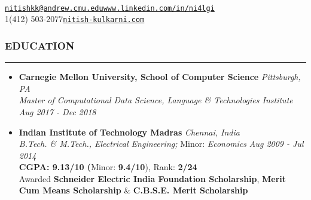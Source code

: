 \documentclass[10pt,a4paper,English]{article}
\newcommand\roottitle[1]{\vspace{-4mm}\subsubsection*{\uppercase{#1}}\vspace{-0.3em}\nopagebreak[4]\hrule\vspace{4mm}}
\newcommand\itemyear[1]{\hfill \emph{\color{itemyear} #1}}
\newcommand\itemenvnoindent{\setlength\itemsep{-1pt} \vspace{-1.5mm}}
\newcommand\hspacing{1mm}
\begin{document}
 \\
\vspace{-5mm}

\small

\noindent \href{mailto:nitishkk@andrew.cmu.edu}{\texttt{nitishkk\mbox{}@\mbox{}andrew.cmu.edu}}\hfill\href{https://www.linkedin.com/in/ni4lgi}{\texttt{www.linkedin.com/in/ni4lgi}}\\
\noindent \textsmaller{+}1(412) 503-2077\hfill\href{http://www.nitish-kulkarni.com}{\texttt{nitish-kulkarni.com}}\\
\vspace{2mm}

\roottitle{Education}
    \begin{itemize}[leftmargin=11pt] \itemenvnoindent
    
    \item \textbf{Carnegie Mellon University, School of Computer Science} \itemyear{Pittsburgh, PA}\\[\hspacing]
        \textit{Master of Computational Data Science, Language \& Technologies Institute} \itemyear{Aug 2017 - Dec 2018} \\[\hspacing]

    \vspace{-3mm}

    \item \textbf{Indian Institute of Technology Madras}  \itemyear{Chennai, India}\\[\hspacing]
        \textit{B.Tech. \& M.Tech., Electrical Engineering;} Minor: \textit{Economics} \itemyear{Aug 2009 - Jul 2014}\\[\hspacing]
        \textbf{CGPA: 9.13/10 (}Minor: \textbf{9.4/10}), Rank: \textbf{2/24} \\[\hspacing]
        Awarded \textbf{Schneider Electric India Foundation Scholarship},
        \textbf{Merit Cum Means Scholarship} \& \textbf{C.B.S.E. Merit Scholarship}
    \end{itemize}
\end{document}
